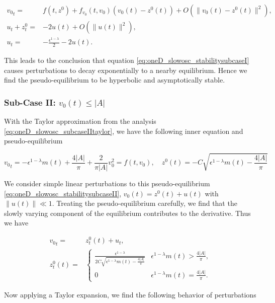 \begin{equation*}
\begin{aligned}
{v_0}_t =& f(t,z^0)+f_{v_0}(t,v_0)(v_0(t)-z^0(t))+O(\lVert v_0(t)-z^0(t) \rVert^2),\\
u_t+z^0_t=&-2u(t)+O(\lVert u(t)\rVert^2),\\
u_t =&-\frac{\epsilon^{1-\lambda}}{2}-2u(t).
\end{aligned}
\end{equation*}

This leads to the conclusion that equation \eqref{eq:oneD_slowosc_stabilitysubcaseI} causes perturbations to decay exponentially to a nearby equilibrium. Hence we find the pseudo-equilibrium to be hyperbolic and asymptotically stable.

\subsubsection*{Sub-Case II: $v_0(t)\le  |A|$}

With the Taylor approximation from the analysis \eqref{eq:oneD_slowosc_subcaseIItaylor}, we have the following inner equation and pseudo-equilibrium

\begin{equation}\label{eq:oneD_slowosc_stabilitysubcaseII}
{v_0}_t= -\epsilon^{1-\lambda}m(t) +\frac{4|A|}{\pi}+\frac{2}{\pi |A|}v_0^2=f(t,v_0),\quad z^0(t)=-C \sqrt{\epsilon^{1-\lambda}m(t)-\frac{4|A|}{\pi}}
\end{equation}

We consider simple linear perturbations to this pseudo-equilibrium \eqref{eq:oneD_slowosc_stabilitysubcaseII}, $v_0(t)=z^0(t)+u(t)$ with $\lVert u(t) \rVert \ll 1$. Treating the pseudo-equilibrium carefully, we find that the slowly varying component of the equilibrium contributes to the derivative. Thus we have

\begin{equation}
\begin{aligned}
{v_0}_t =& z^0_t(t) +u_t,\\
z^0_t(t) = & \begin{cases}
\frac{\epsilon^{1-\lambda}}{2C\sqrt{\epsilon^{1-\lambda}m(t)-\frac{4|A|}{\pi}}} & \epsilon^{1-\lambda}m(t)> \frac{4|A|}{\pi},\\
0 & \epsilon^{1-\lambda}m(t) =\frac{4|A|}{\pi}.
\end{cases}
\end{aligned}
\end{equation}

Now applying a Taylor expansion, we find the following behavior of perturbations

